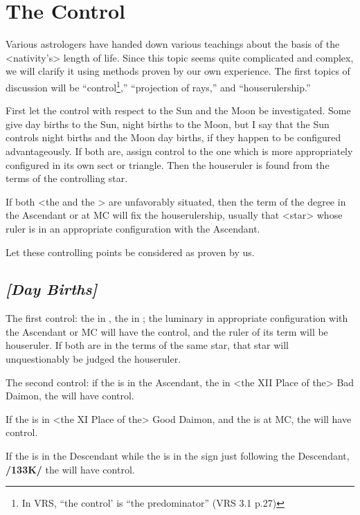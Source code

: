 \section{The Control}

Various astrologers have handed down various teachings about the basis of the <nativity’s> length of life. Since this topic seems quite complicated and complex, we will clarify it using methods proven by our own experience. The first topics of discussion will be “control\footnote{In VRS, ``the control' is ``the predominator'' (VRS 3.1 p.27)},” “projection of rays,” and “houserulership.” 

First \mndl let the control with respect to the Sun and the Moon be investigated. Some give day births to the Sun, night births to the Moon, but I say that the Sun controls night births and the Moon day births, if they happen to be configured advantageously. If both are, assign control to the one which is more appropriately configured in its own sect or triangle. Then the houseruler is found from the terms of the controlling star. 

If both <the \Sun\xspace and the \Moon> are unfavorably situated, then the term of the degree in the Ascendant or at MC will fix the houserulership, usually that <star> whose ruler is in an appropriate configuration with the Ascendant.

Let these controlling points be considered as proven by us. 

\subsection{\textit{[Day Births]}}
The first control: the \Sun\xspace in \Leo, the \Moon\xspace in \Cancer; the luminary in appropriate configuration with the Ascendant or MC will have the control, and the ruler of its term will be houseruler. If both are in the terms of the same star, that star will unquestionably be judged the houseruler.

The second control: if the \Sun\xspace is in the Ascendant, the \Moon\xspace in <the XII Place of the> Bad Daimon, the \Sun\xspace will have control. 

If the \Sun\xspace is in <the XI Place of the> Good Daimon, and the \Moon\xspace is at MC, the \Sun\xspace will have control. 

If the \Sun\xspace is in the Descendant while the \Moon\xspace is in the sign just following the Descendant, \textbf{/133K/} the \Sun\xspace will have control. 

